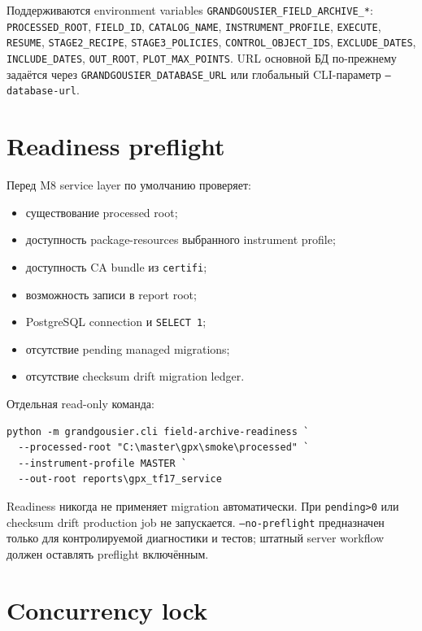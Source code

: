 Поддерживаются environment variables \texttt{GRANDGOUSIER\_FIELD\_ARCHIVE\_*}: \texttt{PROCESSED\_ROOT}, \texttt{FIELD\_ID}, \texttt{CATALOG\_NAME}, \texttt{INSTRUMENT\_PROFILE}, \texttt{EXECUTE}, \texttt{RESUME}, \texttt{STAGE2\_RECIPE}, \texttt{STAGE3\_POLICIES}, \texttt{CONTROL\_OBJECT\_IDS}, \texttt{EXCLUDE\_DATES}, \texttt{INCLUDE\_DATES}, \texttt{OUT\_ROOT}, \texttt{PLOT\_MAX\_POINTS}. URL основной БД по-прежнему задаётся через \texttt{GRANDGOUSIER\_DATABASE\_URL} или глобальный CLI-параметр \texttt{--database-url}.

\section{Readiness preflight}

Перед M8 service layer по умолчанию проверяет:

\begin{itemize}
  \item существование processed root;
  \item доступность package-resources выбранного instrument profile;
  \item доступность CA bundle из \texttt{certifi};
  \item возможность записи в report root;
  \item PostgreSQL connection и \texttt{SELECT 1};
  \item отсутствие pending managed migrations;
  \item отсутствие checksum drift migration ledger.
\end{itemize}

Отдельная read-only команда:

\begin{lstlisting}
python -m grandgousier.cli field-archive-readiness `
  --processed-root "C:\master\gpx\smoke\processed" `
  --instrument-profile MASTER `
  --out-root reports\gpx_tf17_service
\end{lstlisting}

Readiness никогда не применяет migration автоматически. При \texttt{pending>0} или checksum drift production job не запускается. \texttt{--no-preflight} предназначен только для контролируемой диагностики и тестов; штатный server workflow должен оставлять preflight включённым.

\section{Concurrency lock}

